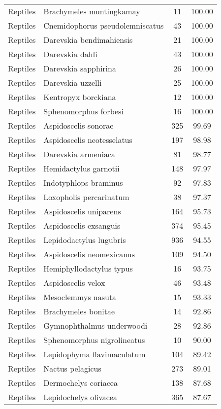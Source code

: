 \begin{longtable}{llcc}
  Reptiles & Brachymeles muntingkamay &  11 & 100.00 \\ 
  Reptiles & Cnemidophorus pseudolemniscatus &  43 & 100.00 \\ 
  Reptiles & Darevskia bendimahiensis &  21 & 100.00 \\ 
  Reptiles & Darevskia dahli &  43 & 100.00 \\ 
  Reptiles & Darevskia sapphirina &  26 & 100.00 \\ 
  Reptiles & Darevskia uzzelli &  25 & 100.00 \\ 
  Reptiles & Kentropyx borckiana &  12 & 100.00 \\ 
  Reptiles & Sphenomorphus forbesi &  16 & 100.00 \\ 
  Reptiles & Aspidoscelis sonorae & 325 & 99.69 \\ 
  Reptiles & Aspidoscelis neotesselatus & 197 & 98.98 \\ 
  Reptiles & Darevskia armeniaca &  81 & 98.77 \\ 
  Reptiles & Hemidactylus garnotii & 148 & 97.97 \\ 
  Reptiles & Indotyphlops braminus &  92 & 97.83 \\ 
  Reptiles & Loxopholis percarinatum &  38 & 97.37 \\ 
  Reptiles & Aspidoscelis uniparens & 164 & 95.73 \\ 
  Reptiles & Aspidoscelis exsanguis & 374 & 95.45 \\ 
  Reptiles & Lepidodactylus lugubris & 936 & 94.55 \\ 
  Reptiles & Aspidoscelis neomexicanus & 109 & 94.50 \\ 
  Reptiles & Hemiphyllodactylus typus &  16 & 93.75 \\ 
  Reptiles & Aspidoscelis velox &  46 & 93.48 \\ 
  Reptiles & Mesoclemmys nasuta &  15 & 93.33 \\ 
  Reptiles & Brachymeles bonitae &  14 & 92.86 \\ 
  Reptiles & Gymnophthalmus underwoodi &  28 & 92.86 \\ 
  Reptiles & Sphenomorphus nigrolineatus &  10 & 90.00 \\ 
  Reptiles & Lepidophyma flavimaculatum & 104 & 89.42 \\ 
  Reptiles & Nactus pelagicus & 273 & 89.01 \\ 
  Reptiles & Dermochelys coriacea & 138 & 87.68 \\ 
  Reptiles & Lepidochelys olivacea & 365 & 87.67 \\ 

\end{longtable}
